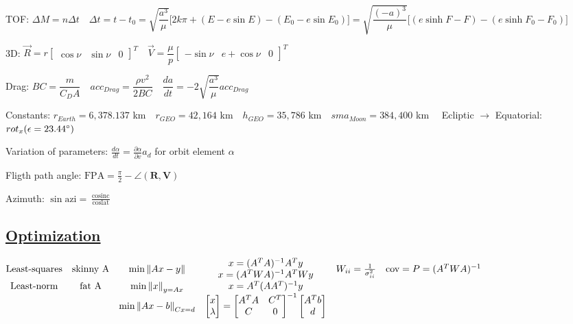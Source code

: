 \documentclass[11pt,landscape]{article}
\begin{document}
TOF:
$
\Delta M = n \Delta t
\quad
\Delta t = t - t_0
= \sqrt{\dfrac{a^3}{\mu}} \big[ 2 k \pi + (E-e\sin E) - (E_0-e\sin E_0) \big]
= \sqrt{\dfrac{(-a)^3}{\mu}} \big[ (e\sinh F - F) - (e\sinh F_0 - F_0) \big]
$

3D:
$
\vec{R} = r \begin{bmatrix} \cos\nu & \sin\nu & 0 \end{bmatrix}^T
\quad
\vec{V} = \dfrac{\mu}{p} \begin{bmatrix} -\sin\nu & e+\cos\nu & 0 \end{bmatrix}^T
$

Drag:
$
BC = \dfrac{m}{C_D A}
\quad
acc_{Drag} = \dfrac{\rho v^2}{2 BC}
\quad
\dfrac{da}{dt} = -2 \sqrt{\dfrac{a^3}{\mu}} acc_{Drag}
$

Constants: 
$
r_{Earth} = 6,378.137 $ km$
\quad
r_{GEO} = 42,164 $ km$
\quad
h_{GEO} = 35,786 $ km$
\quad
sma_{Moon} = 384,400 $ km$
\quad
$
Ecliptic $\rightarrow$ Equatorial: $rot_x( \epsilon = 23.44\degree )$


Variation of parameters: 
$\frac{d\alpha}{dt} = \frac{\partial\alpha}{\partial v} a_d$
for orbit element $\alpha$

Fligth path angle:
$\text{FPA} = \frac{\pi}{2} - \angle (\bm R, \bm V)$

Azimuth:
$\sin\text{azi} = \frac{ \cos\text{inc} }{ \cos\text{lat} }$



\newpage
\subsection{\underline{Optimization}}

$
\begin{matrix}
\text{Least-squares} & \text{skinny A} & \text{min} \left\lVert Ax-y \right\rVert & 
	\begin{matrix} x = (A^TA)^{-1}A^Ty \\ x = (A^TWA)^{-1}A^TWy \end{matrix} &
	W_{ii}=\frac{1}{\sigma_{ii}^2} \quad \text{cov} = P = (A^TWA)^{-1} \\
\text{Least-norm} & \text{fat A} & \text{min} \left\lVert x \right\rVert_{y=Ax} & x = A^T(AA^T)^{-1}y \\
	&  & \text{min}\left\lVert Ax-b \right\rVert_{Cx=d} & 
	\begin{bmatrix} x \\ \lambda \end{bmatrix} =
	\begin{bmatrix} A^TA & C^T \\ C & 0 \end{bmatrix}^{-1}
	\begin{bmatrix} A^Tb \\ d \end{bmatrix}
\end{matrix}
$
\end{document}
